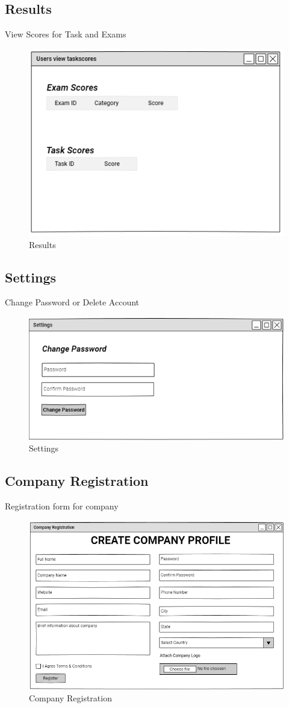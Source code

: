 \documentclass[a4paper,12pt]{report}
\begin{document}
\subsection {Results}
View Scores for Task and Exams
\begin{figure}[bph]
	\centering
	\includegraphics[width=.6\linewidth ]{img/user/userviewscr}
\caption{Results}
\end{figure}
\pagebreak

\pagebreak
\subsection {Settings}
Change Password or Delete Account
\begin{figure}[bph]
	\centering
	\includegraphics[width=.6\linewidth ]{img/user/userstings}
	\caption{Settings}
\end{figure}

\subsection {Company Registration}
Registration form for company
\begin{figure}[bph]
	\centering
	\includegraphics[width=.8\linewidth ]{img/company/company_registration}
	\caption{Company Registration}
\end{figure}
\pagebreak
\end{document}
